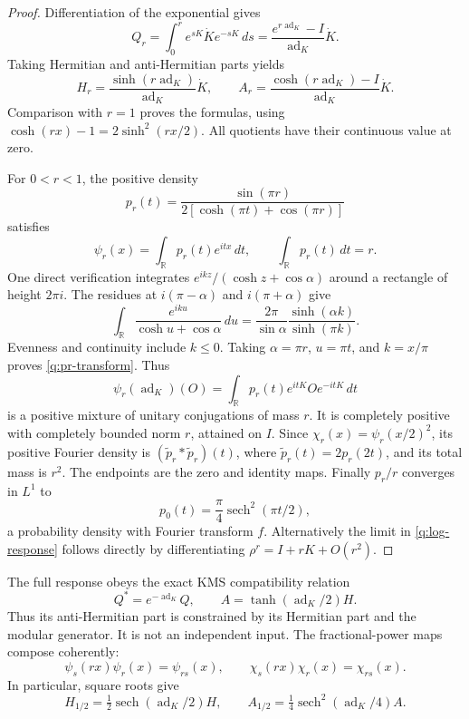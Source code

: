 \begin{proof}
Differentiation of the exponential gives
\[
 Q_r=\int_0^r e^{sK}\dot K e^{-sK}\,ds
     =\frac{e^{r\operatorname{ad}_K}-I}
                  {\operatorname{ad}_K}\dot K.
\]
Taking Hermitian and anti-Hermitian parts yields
\[
 H_r=\frac{\sinh(r\operatorname{ad}_K)}{\operatorname{ad}_K}\dot K,
 \qquad
 A_r=\frac{\cosh(r\operatorname{ad}_K)-I}
                    {\operatorname{ad}_K}\dot K.
\]
Comparison with $r=1$ proves the formulas, using
$\cosh(rx)-1=2\sinh^2(rx/2)$.  All quotients have their continuous
value at zero.

For $0<r<1$, the positive density
\begin{equation}
 p_r(t)=\frac{\sin(\pi r)}
              {2[\cosh(\pi t)+\cos(\pi r)]}
 \label{q:pr-kernel}
\end{equation}
satisfies
\begin{equation}
 \psi_r(x)=\int_{\mathbb R}p_r(t)e^{itx}\,dt,
 \qquad \int_{\mathbb R}p_r(t)\,dt=r.
 \label{q:pr-transform}
\end{equation}
One direct verification integrates
$e^{ikz}/(\cosh z+\cos\alpha)$ around a rectangle of height $2\pi i$.
The residues at $i(\pi-\alpha)$ and $i(\pi+\alpha)$ give
\[
 \int_{\mathbb R}\frac{e^{iku}}{\cosh u+\cos\alpha}\,du
 =\frac{2\pi}{\sin\alpha}
      \frac{\sinh(\alpha k)}{\sinh(\pi k)}.
\]
Evenness and continuity include $k\leq0$.  Taking $\alpha=\pi r$,
$u=\pi t$, and $k=x/\pi$ proves \eqref{q:pr-transform}.
Thus
\[
 \psi_r(\operatorname{ad}_K)(O)
 =\int_{\mathbb R}p_r(t)e^{itK}Oe^{-itK}\,dt
\]
is a positive mixture of unitary conjugations of mass $r$.  It is
completely positive with completely bounded norm $r$, attained on $I$.
Since $\chi_r(x)=\psi_r(x/2)^2$, its positive Fourier density is
$(\widetilde p_r*\widetilde p_r)(t)$, where
$\widetilde p_r(t)=2p_r(2t)$, and its total mass is $r^2$.
The endpoints are the zero and identity maps.  Finally
$p_r/r$ converges in $L^1$ to
\[
 p_0(t)=\frac\pi4\operatorname{sech}^2(\pi t/2),
\]
a probability density with Fourier transform $f$.  Alternatively the
limit in \eqref{q:log-response} follows directly by differentiating
$\rho^r=I+rK+O(r^2)$.
\end{proof}

The full response obeys the exact KMS compatibility relation
\begin{equation}
 Q^*=e^{-\operatorname{ad}_K}Q,
 \qquad A=\tanh(\operatorname{ad}_K/2)H.
 \label{q:kms-compatibility}
\end{equation}
Thus its anti-Hermitian part is constrained by its Hermitian part and
the modular generator.  It is not an independent input.  The
fractional-power maps compose coherently:
\[
 \psi_s(rx)\psi_r(x)=\psi_{rs}(x),\qquad
 \chi_s(rx)\chi_r(x)=\chi_{rs}(x).
\]
In particular, square roots give
\[
 H_{1/2}=\tfrac12\operatorname{sech}(\operatorname{ad}_K/2)H,
 \qquad
 A_{1/2}=\tfrac14\operatorname{sech}^2(\operatorname{ad}_K/4)A.
\]

